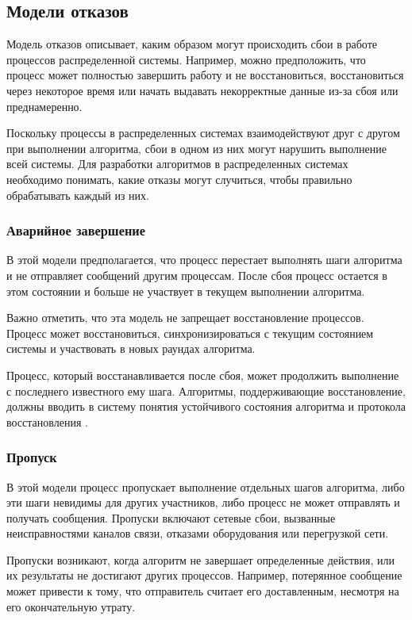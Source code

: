 \subsection{Модели отказов}

Модель отказов описывает, каким образом могут происходить сбои в работе
процессов распределенной системы. Например, можно предположить, что процесс
может полностью завершить работу и не восстановиться, восстановиться через
некоторое время или начать выдавать некорректные данные из-за сбоя или
преднамеренно.

Поскольку процессы в распределенных системах взаимодействуют друг с другом
при выполнении алгоритма, сбои в одном из них могут нарушить выполнение всей
системы. Для разработки алгоритмов в распределенных системах необходимо понимать,
какие отказы могут случиться, чтобы правильно обрабатывать каждый из них.

\subsubsection*{Аварийное завершение}

В этой модели предполагается, что процесс перестает выполнять шаги алгоритма
и не отправляет сообщений другим процессам. После сбоя процесс остается в этом
состоянии и больше не участвует в текущем выполнении алгоритма.

Важно отметить, что эта модель не запрещает восстановление процессов. Процесс
может восстановиться, синхронизироваться с текущим состоянием системы и
участвовать в новых раундах алгоритма.

Процесс, который восстанавливается после сбоя, может продолжить выполнение с
последнего известного ему шага. Алгоритмы, поддерживающие восстановление,
должны вводить в систему понятия устойчивого состояния алгоритма и протокола
восстановления \cite{skeen83}.

\subsubsection*{Пропуск}

В этой модели процесс пропускает выполнение отдельных шагов алгоритма, либо
эти шаги невидимы для других участников, либо процесс не может отправлять и
получать сообщения. Пропуски включают сетевые сбои, вызванные неисправностями
каналов связи, отказами оборудования или перегрузкой сети.

Пропуски возникают, когда алгоритм не завершает определенные действия, или их
результаты не достигают других процессов. Например, потерянное сообщение может
привести к тому, что отправитель считает его доставленным, несмотря на его
окончательную утрату.

